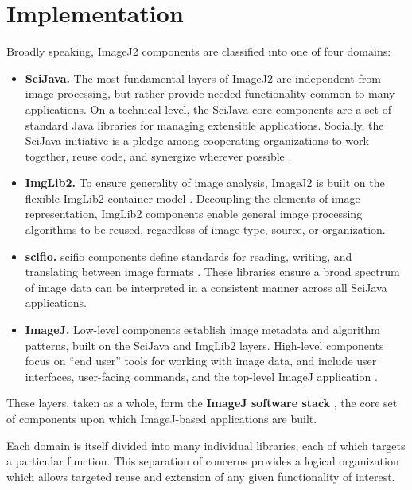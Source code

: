 \documentclass{bmcart}
\begin{document}

\section*{Implementation}
Broadly speaking, ImageJ2 components are classified into one of four domains:

\begin{itemize}
  \item \textbf{SciJava.} The most fundamental layers of ImageJ2 are
    independent from image processing, but rather provide needed functionality
    common to many applications. On a technical level, the SciJava core
    components are a set of standard Java libraries for managing extensible
    applications. Socially, the SciJava initiative is a pledge among
    cooperating organizations to work together, reuse code, and synergize
    wherever possible \cite{imagej_scijava}.
  \item \textbf{ImgLib2.} To ensure generality of image analysis, ImageJ2 is
    built on the flexible ImgLib2 container model \cite{imglib2}. Decoupling the
    elements of image representation, ImgLib2 components enable general image
    processing algorithms to be reused, regardless of image type, source, or
    organization.
  \item \textbf{\acrfull{scifio}.} \acrshort{scifio} components define
    standards for reading, writing, and translating between image formats
    \cite{scifio}. These libraries ensure a broad spectrum of image data can be
    interpreted in a consistent manner across all SciJava applications.
  \item \textbf{ImageJ.} Low-level components establish image metadata and algorithm
    patterns, built on the SciJava and ImgLib2 layers. High-level
    components focus on ``end user'' tools for working with image data,
    and include user interfaces, user-facing commands, and the top-level
    ImageJ application \cite{imagej_web_site}.
\end{itemize}

These layers, taken as a whole, form the \textbf{ImageJ software stack}
\cite{imagej_architecture}, the core set of components upon which ImageJ-based
applications are built.

Each domain is itself divided into many individual libraries, each of which
targets a particular function. This separation of concerns provides a logical
organization which allows targeted reuse and extension of any given
functionality of interest.
\end{document}

